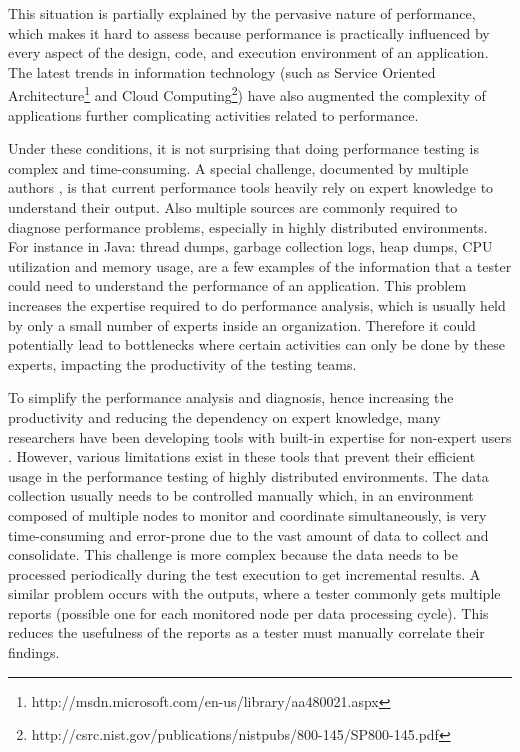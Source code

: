 \documentclass[runningheads,a4paper]{llncs}
\begin{document}
This situation is partially explained by the pervasive nature of
performance, which makes it hard to assess because performance is practically
influenced by every aspect of the design, code, and execution environment
of an application. The latest trends in information technology (such
as Service Oriented
Architecture\footnote{http://msdn.microsoft.com/en-us/library/aa480021.aspx} and 
Cloud Computing\footnote{http://csrc.nist.gov/publications/nistpubs/800-145/SP800-145.pdf}) 
have also augmented the complexity of applications further complicating activities related to
performance. 

Under these conditions, it is not surprising that doing performance
testing is complex and time-consuming. A special challenge, documented by
multiple authors \cite{Woodside2007,trevor1,Angelopoulos2012}, is that current
performance tools heavily rely on expert knowledge to understand their output.
Also multiple sources are commonly required to diagnose performance problems,
especially in highly distributed environments. For instance in Java: thread dumps, 
garbage collection logs, heap dumps, CPU utilization and memory usage, are a few
examples of the information that a tester could need to understand the performance 
of an application. This problem increases the expertise required to do
performance analysis, which is usually held by only a small number of experts 
inside an organization\cite{Spear2009}. Therefore it could potentially lead to
bottlenecks where certain activities can only be done by these experts,
impacting the productivity of the testing teams\cite{Angelopoulos2012}.

To simplify the performance analysis and diagnosis, hence increasing the
productivity and reducing the dependency on expert knowledge, many researchers
have been developing tools with built-in expertise for non-expert
users \cite{Altman2010,pat7,Angelopoulos2012}. However, various limitations
exist in these tools that prevent their efficient usage in the performance
testing of highly distributed environments. The data collection usually needs
to be controlled manually which, in an environment composed of multiple nodes to
monitor and coordinate simultaneously, is very time-consuming and error-prone
due to the vast amount of data to collect and consolidate. This challenge is
more complex because the data needs to be processed periodically during the
test execution to get incremental results. A similar problem occurs 
with the outputs, where a tester commonly gets multiple
reports (possible one for each monitored node per data processing cycle). This
reduces the usefulness of the reports as a tester must manually
correlate their findings.
\end{document}
